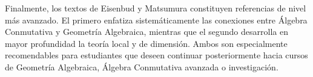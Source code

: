 \begin{refsection}
Finalmente, los textos de Eisenbud \cite{Eis95} y Matsumura \cite{Mat86} constituyen referencias de nivel más avanzado. El primero enfatiza sistemáticamente las conexiones entre Álgebra Conmutativa y Geometría Algebraica, mientras que el segundo desarrolla en mayor profundidad la teoría local y de dimensión. Ambos son especialmente recomendables para estudiantes que deseen continuar posteriormente hacia cursos de Geometría Algebraica, Álgebra Conmutativa avanzada o investigación.


\nocite{AK21}
\nocite{Kem11}
\nocite{AM69}
\nocite{Rei95}
\nocite{Sha00}
\nocite{CLO25}
\nocite{GP08}
\nocite{Eis95}
\nocite{Mat86}


\printbibliography[heading=subbibliography]
\end{refsection}